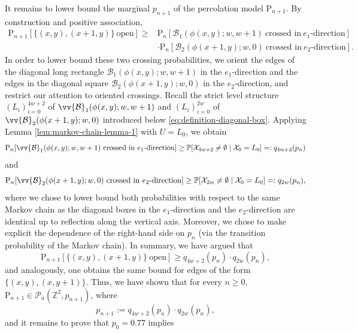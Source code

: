 \documentclass[11pt]{article}
\renewcommand{\P}{\mathrm{P}}
\newcommand{\Z}{\mathbb{Z}}
\theoremstyle{remark}
\begin{document}
It remains to lower bound the marginal $p_{n+1}$ of the percolation model $\P_{n+1}$. By construction and positive association, 
\begin{align}
    \P_{n+1}[\{(x,y),(x+1,y)\}\ \text{open}] \ge &\P_n[\mathcal{B}_1(\phi(x,y);w,w+1) \ \text{crossed in}\ e_1\text{-direction} ] \\
    &\cdot \P_n[\mathcal{B}_2(\phi(x+1,y);w,0) \ \text{crossed in}\ e_2\text{-direction} ].
\end{align} 
In order to lower bound these two crossing probabilities, we orient the edges of the diagonal long rectangle $\mathcal{B}_1(\phi(x,y);w,w+1)$ in the $e_1$-direction and the edges in the diagonal square $\mathcal{B}_2(\phi(x+1,y);w,0)$ in the $e_2$-direction, and restrict our attention to oriented crossings. Recall the strict level structure $(L_i)_{i=0}^{4w+2}$ of $\vv{\mathcal{B}}_1(\phi(x,y);w,w+1)$ and $(L_i)_{i=0}^{2w}$ of $\vv{\mathcal{B}}_2(\phi(x+1,y);w,0)$ introduced below \eqref{eq:definition-diagonal-box}.  Applying Lemma \ref{lem:markov-chain-lemma-1} with $U=L_0$, we obtain 
\begin{equation}
    \P_n[\vv{\mathcal{B}}_1(\phi(x,y);w,w+1) \ \text{crossed in}\ e_1\text{-direction} ] \ge \mathbb P[\mathcal X_{4w + 2} \neq \emptyset \mid \mathcal X_0  =L_0] =: q_{4w+2}(p_n)
\end{equation}
and
\begin{equation}
    \P_n[\vv{\mathcal{B}}_2(\phi(x+1,y);w,0) \ \text{crossed in}\ e_2\text{-direction} ] \ge \mathbb P[\mathcal X_{2w} \neq \emptyset \mid \mathcal X_0  =L_0] =: q_{2w}(p_n),
\end{equation}
where we chose to lower bound both probabilities with respect to the same Markov chain as the diagonal boxes in the $e_1$-direction and the $e_2$-direction are identical up to reflection along the vertical axis. Moreover, we chose to make explicit the dependence of the right-hand side on $p_n$ (via the transition probability of  the Markov chain). In summary, we have argued that 
\begin{equation}
    \P_{n+1}[\{(x,y),(x+1,y)\}\ \text{open}] \ge q_{4w+2}(p_n) \cdot q_{2w}(p_n),
\end{equation} 
and analogously, one obtains the same bound for edges of the form $\{(x,y),(x,y+1)\}$. Thus, we have shown that for every $n\ge 0$, $\P_{n+1} \in \mathcal{P}_a(\Z^2,p_{n+1})$, where 
\begin{equation}
    p_{n+1} := q_{4w+2}(p_n) \cdot q_{2w}(p_n),
\end{equation}
and it remains to prove that $p_0 = 0.77$ implies
\end{document}
